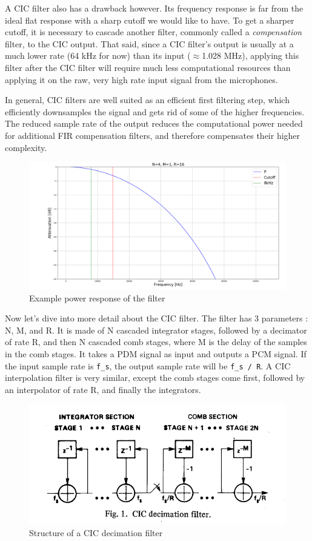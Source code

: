 \documentclass[]{report}
\begin{document}
A CIC filter also has a drawback however. Its frequency response is far from the ideal flat response with a sharp cutoff we would like to have. To get a sharper cutoff, it is necessary to cascade another filter, commonly called a \emph{compensation} filter, to the CIC output. That said, since a CIC filter's output is usually at a much lower rate (64 kHz for now) than its input ($ \approx $1.028 MHz), applying this filter after the CIC filter will require much less computational resources than applying it on the raw, very high rate input signal from the microphones.

In general, CIC filters are well suited as an efficient first filtering step, which efficiently downsamples the signal and gets rid of some of the higher frequencies. The reduced sample rate of the output reduces the computational power needed for additional FIR compensation filters, and therefore compensates their higher complexity.

\begin{figure}
\centering
\includegraphics[width=0.9\linewidth]{Pictures/CIC_power_resp.png}
\caption{Example power response of the filter}
\end{figure}

Now let's dive into more detail about the CIC filter. The filter has 3 parameters : N, M, and R. It is made of N cascaded integrator stages, followed by a decimator of rate R, and then N cascaded comb stages, where M is the delay of the samples in the comb stages. It takes a PDM signal as input and outputs a PCM signal. If the input sample rate is \texttt{f\_s}, the output sample rate will be \texttt{f\_s / R}. A CIC interpolation filter is very similar, except the comb stages come first, followed by an interpolator of rate R, and finally the integrators.

\begin{figure}[h]
\centering
\includegraphics[width=0.9\linewidth]{Pictures/CIC_structure.png}
\caption{Structure of a CIC decimation filter}
\end{figure}
\end{document}
